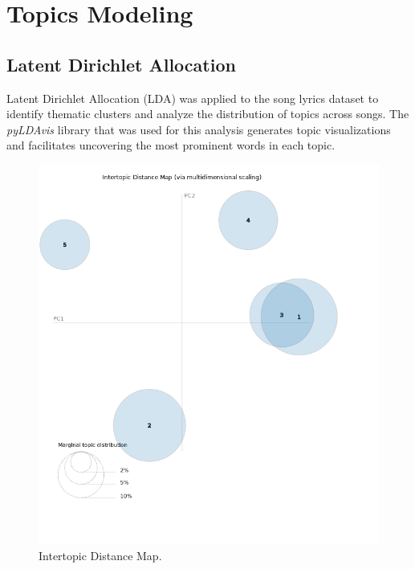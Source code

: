 

\section{Topics Modeling}
\label{sec:topicsmodeling}

\subsection{Latent Dirichlet Allocation}

Latent Dirichlet Allocation (LDA) was applied to the song lyrics dataset to
identify thematic clusters and analyze the distribution of topics across songs.
The \textit{pyLDAvis} library that was used for this analysis generates topic
visualizations and facilitates uncovering the most prominent words in each
topic. \cite{pylda}

\begin{center}
\begin{figure}[H]
  \centering
  \includegraphics[width=6in]{img/topics/png/topics.png}
  \caption{Intertopic Distance Map.}
  \label{Figure:intertopicdistancemap}
\end{figure}
\end{center}

